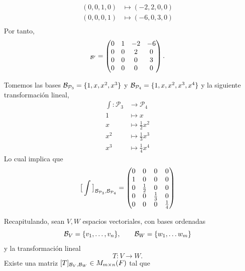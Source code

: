 \documentclass[12pt,a4paper]{book}
\newcommand{\llaves}[1]{\{#1\}}
\begin{document}
\begin{ejemplo}
\begin{align*}
            (0, 0, 1, 0) & \mapsto (-2, 2, 0, 0)\\
            (0, 0, 0, 1) & \mapsto (-6, 0, 3, 0)\\
        \end{align*}
        Por tanto,
        \begin{equation*}
            [\mathcal{D}]_{\BB'} = 
            \begin{pmatrix}
                0 & 1 & -2 & -6\\
                0 & 0 & 2 & 0\\
                0 & 0 & 0 & 3\\
                0 & 0 & 0 & 0
            \end{pmatrix}.
        \end{equation*}
    \end{ejemplo}

    \vspace{5cm}

    \begin{ejemplo}
        Tomemos las bases $\BB_{\mathcal{P}_3} = \llaves{1, x, x^2, x^3}$ y $\BB_{\mathcal{P}_4} = \llaves{1, x, x^2, x^3, x^4}$ y la siguiente transformación lineal,
        \begin{align*}
            \int : \mathcal{P}_3 & \to \mathcal{P}_4\\
            1 & \mapsto x\\
            x & \mapsto \frac{1}{2}x^2\\
            x^2 & \mapsto \frac{1}{3}x^3\\
            x^3 & \mapsto \frac{1}{4}x^4
        \end{align*}
        Lo cual implica que
        \begin{equation*}
            \big[ \int \big]_{\mathcal{B}_{\mathcal{P}_3}, \mathcal{B}_{\mathcal{P}_4}} =
            \begin{pmatrix}
                0 & 0 & 0 & 0\\
                1 & 0 & 0 & 0\\
                0 & \frac{1}{2} & 0 & 0\\
                0 & 0 & \frac{1}{3} & 0\\
                0 & 0 & 0 & \frac{1}{4}\\
            \end{pmatrix}
        \end{equation*}
    \end{ejemplo}

    Recapitulando, sean $V, W$ espacios vectoriales, con bases ordenadas
    \begin{equation*}
        \BB_V = \llaves{v_1, \dots , v_n}, \qquad \BB_W = \llaves{w_1, \dots w_m}
    \end{equation*}
    y la transformación lineal 
    \begin{equation*}
        T : V \to W.
    \end{equation*}
    Existe una matriz $[T]_{\mathcal{B}_V, \mathcal{B}_W} \in M_{m \times n}(F)$ tal que 
\end{document}
